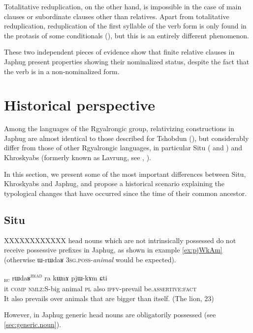 \documentclass[oldfontcommands,oneside,a4paper,11pt]{article}
\newcommand{\ipa}[1]{{\phon #1}} %
\newcommand{\tete}{\textsuperscript{\textsc{head}}}
\newcommand{\rc}{\textsubscript{\textsc{rc}}}
\begin{document}
Totalitative reduplication, on the other hand, is impossible in the case of main clauses or subordinate clauses other than relatives. Apart from totalitative reduplication, reduplication of the first syllable of the verb form is only found in the protasis of some conditionals (\citealt{jacques14linking}), but this is an entirely different phenomenon.

These two independent pieces of evidence show that finite relative clauses in Japhug present properties showing their nominalized status, despite the fact that the verb is in a non-nominalized form.

\section{Historical perspective}
Among the languages of the Rgyalrongic group, relativizing constructions in Japhug are almost identical to those described for Tshobdun (\citealt{jacksonlin07}), but considerably differ from those of other Rgyalrongic languages, in particular Situ (\citealt{jacksonlin07} and \citealt{prins11kyomkyo}) and Khroskyabs (formerly known as Lavrung, see \citealt[103]{huangbf07lavrung}, \citealt[70]{lai13affixale}). 

In this section, we present some of the most important differences between Situ, Khroskyabs and Japhug, and propose a historical scenario explaining the typological changes that have occurred since the time of their common ancestor.


\subsection{Situ}

XXXXXXXXXXXX
head nouns which are not intrinsically possessed do not receive possessive prefixes in Japhug, as shown in example \ref{ex:pjWkAm} (otherwise \ipa{ɯ-rɯdaʁ} \textsc{3sg.poss}-\textit{animal} would be expected).

\begin{exe}
\ex \label{ex:pjWkAm}
\gll
[\ipa{ɯʑo}  	\ipa{sɤz}  	\ipa{kɯ-wxti}]\rc{}   	\ipa{rɯdaʁ}\tete{}  	\ipa{ra}  	\ipa{kɯnɤ}  	\ipa{pjɯ-kɤm}  	\ipa{ɕti}  \\
it \textsc{comp} \textsc{nmlz}:S-big animal \textsc{pl} also \textsc{ipfv}-prevail be.\textsc{assertive}:\textsc{fact} \\
\glt It also prevails over animals that are bigger than itself. (The lion, 23)
  \end{exe}
  However, in Japhug generic head nouns are obligatorily possessed (see \ref{sec:generic.noun}).
  
\end{document}

